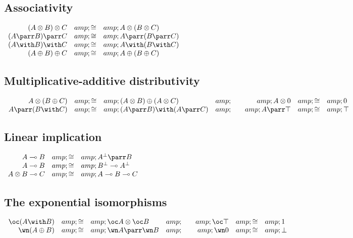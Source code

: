 \subsection{Associativity}\label{associativity}

\(\begin{array}{rcl}
  (A\tens B)\tens C &amp;\cong&amp; A\tens(B\tens C)\\
  (A\parr B)\parr C &amp;\cong&amp; A\parr(B\parr C)\\
  (A\with B)\with C &amp;\cong&amp; A\with(B\with C)\\
  (A\plus B)\plus C &amp;\cong&amp; A\plus(B\plus C)\\
\end{array}\)

\subsection{Multiplicative-additive
distributivity}\label{multiplicative-additive-distributivity}

\(\begin{array}{rclcrcl}
  A\tens(B\plus C) &amp;\cong&amp; (A\tens B)\plus(A\tens C) &amp;\quad&amp;
  A\tens\zero &amp;\cong&amp; \zero\\
  A\parr(B\with C) &amp;\cong&amp; (A\parr B)\with(A\parr C) &amp;\quad&amp;
  A\parr\top &amp;\cong&amp; \top\\
\end{array}\)

\subsection{Linear implication}\label{linear-implication}

\(\begin{array}{rclcrcl}
  A\limp B &amp;\cong&amp; A\orth\parr B\\
  A\limp B &amp;\cong&amp; B\orth\limp A\orth\\
  A\tens B \limp C &amp;\cong&amp; A\limp B \limp C\\
\end{array}\)

\subsection{The exponential
isomorphisms}\label{the-exponential-isomorphisms}

\(\begin{array}{rclcrcl}
  \oc(A\with B) &amp;\cong&amp; \oc A\tens\oc B &amp;\quad&amp; \oc\top &amp;\cong&amp; \one\\
  \wn(A\plus B) &amp;\cong&amp; \wn A\parr\wn B &amp;\quad&amp; \wn\zero &amp;\cong&amp; \bot\\
\end{array}\)

